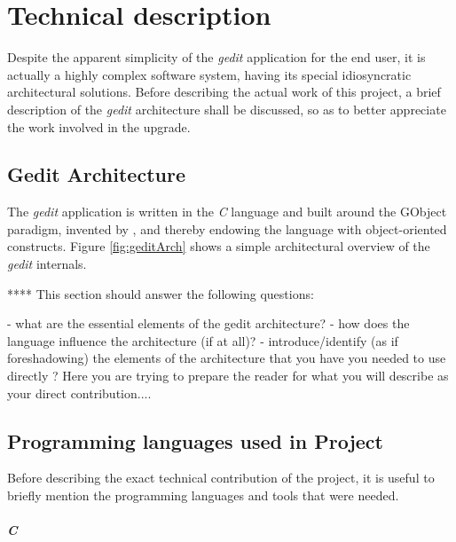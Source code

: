 \chapter{Technical description}


Despite the apparent simplicity of the \emph{gedit} application for the end user, it 
is actually a highly complex software system, having its special idiosyncratic 
architectural solutions.   Before describing the actual work of this project, a brief 
description of the \emph{gedit} architecture shall be discussed, so as to better appreciate 
the work involved in the upgrade.  


\section{Gedit Architecture}

The \emph{gedit} application is written in the \emph{C} language and built around the 
GObject paradigm, invented by \GNOME, and thereby endowing the language with object-oriented constructs. 
Figure \ref{fig:geditArch} shows a simple architectural overview of the \emph{gedit} internals.



**** This section should answer the following questions: 

   - what are the essential elements of the gedit architecture?
   - how does the language influence the architecture (if at all)?
   - introduce/identify (as if foreshadowing) the elements of the architecture that 
     you have you needed to use directly ?   Here you are trying to prepare the 
     reader for what you will describe as your direct contribution....




\section{Programming languages used in Project}
\label{sec:ProgrammingLanguages}

Before describing the exact technical contribution of the project, it is useful to briefly mention 
the programming languages and tools that were needed.  

\paragraph{C} 

